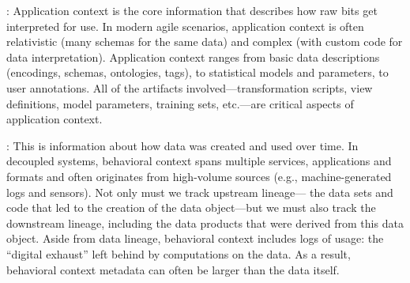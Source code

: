 \documentclass{sig-alternate}
\begin{document}


: Application context is the core information that describes how raw bits get interpreted for use. 
In modern agile scenarios, application context is often relativistic (many schemas for the same data) and complex (with custom code for data interpretation). 
Application context ranges from basic data descriptions (encodings, schemas, ontologies, tags), to statistical models and parameters, to user annotations.  
All of the artifacts involved---transformation scripts, view definitions, model parameters, training sets, etc.---are critical aspects of application context. 

: This is information about how data was created and used over time. 
In decoupled systems, behavioral context spans multiple services, applications and formats and often originates from high-volume sources (e.g., machine-generated logs and sensors).
Not only must we track upstream lineage---
the data sets and code that led to the creation of the data object---but we must also track the 
downstream lineage, including the data products that were derived from this data object. 
Aside from data lineage, behavioral context includes logs of usage: the ``digital exhaust'' left behind by computations on the data. 
As a result, behavioral context metadata can 
often be larger than the data itself. 
\end{document}
